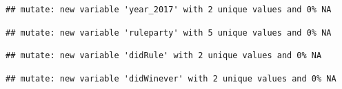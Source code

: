 \documentclass[]{article}
\newenvironment{Shaded}{\begin{snugshade}}{\end{snugshade}}
\newcommand{\DataTypeTok}[1]{\textcolor[rgb]{0.13,0.29,0.53}{#1}}
\newcommand{\DecValTok}[1]{\textcolor[rgb]{0.00,0.00,0.81}{#1}}
\newcommand{\KeywordTok}[1]{\textcolor[rgb]{0.13,0.29,0.53}{\textbf{#1}}}
\newcommand{\NormalTok}[1]{#1}
\newcommand{\OperatorTok}[1]{\textcolor[rgb]{0.81,0.36,0.00}{\textbf{#1}}}
\newcommand{\StringTok}[1]{\textcolor[rgb]{0.31,0.60,0.02}{#1}}
\begin{document}
\begin{verbatim}
## mutate: new variable 'year_2017' with 2 unique values and 0% NA
\end{verbatim}

\begin{Shaded}
\end{Shaded}

\begin{verbatim}
## mutate: new variable 'ruleparty' with 5 unique values and 0% NA
\end{verbatim}

\begin{Shaded}
\end{Shaded}

\begin{verbatim}
## mutate: new variable 'didRule' with 2 unique values and 0% NA
\end{verbatim}

\begin{Shaded}
\end{Shaded}

\begin{verbatim}
## mutate: new variable 'didWinever' with 2 unique values and 0% NA
\end{verbatim}

\begin{Shaded}
\end{Shaded}
\end{document}
